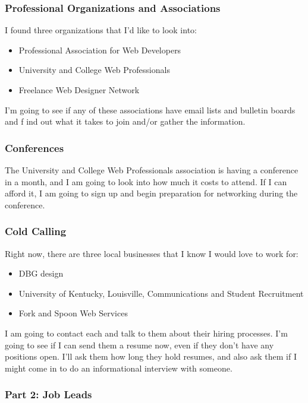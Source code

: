\subsubsection*{Professional Organizations and Associations}

I found three organizations that I'd like to look into:
\begin{itemize}
	\item Professional Association for Web Developers
	\item University and College Web Professionals
	\item Freelance Web Designer Network
\end{itemize}
I'm going to see if any of these associations have email lists and bulletin boards and f ind out what it takes to join and/or gather the information.

\subsubsection*{Conferences}

The University and College Web Professionals association is having a conference in a month, and I am going to look into how much it costs to attend. If I can afford it, I am going to sign up and begin preparation for networking during the conference.

\subsubsection*{Cold Calling}

Right now, there are three local businesses that I know I would love to work for:
\begin{itemize}
	\item DBG design
	\item University of Kentucky, Louisville, Communications and Student Recruitment
	\item Fork and Spoon Web Services
\end{itemize}
I am going to contact each and talk to them about their hiring processes. I'm going to see if I can send them a resume now, even if they don't have any positions open. I'll ask them how long they hold resumes, and also ask them if I might come in to do an informational interview with someone.

\subsubsection*{Part 2: Job Leads}
